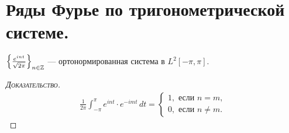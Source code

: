 \documentclass[../complex-analysis.tex]{subfiles}
\begin{document}
\section{Ряды Фурье по тригонометрической системе.}

\begin{claim}
 $ \left\{ \frac{e^{int}}{\sqrt{2\pi}} \right\}_{n \in \mathbb{Z}} $ --- ортонормированная система в $ L^{2}[-\pi,\pi] $.
\end{claim}
\begin{proof}[\normalfont\textsc{Доказательство}]
 \begin{align*}
  \frac{1}{2\pi} \int_{-\pi}^{\pi} e^{int} \cdot e^{-imt}\,dt = \begin{cases}
   1, \text{ если } n = m, \\
   0, \text{ если } n \neq m.
  \end{cases} 
 \end{align*}
\end{proof}
\end{document}
